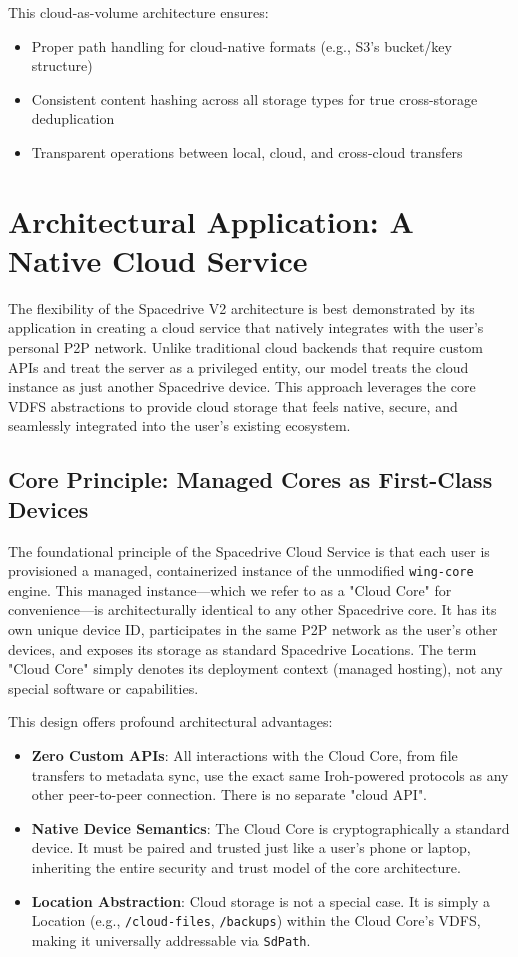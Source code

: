 \documentclass[sigconf]{acmart}
\begin{document}
This cloud-as-volume architecture ensures:
\begin{itemize}[noitemsep, topsep=0pt]
    \item Proper path handling for cloud-native formats (e.g., S3's bucket/key structure)
    \item Consistent content hashing across all storage types for true cross-storage deduplication
    \item Transparent operations between local, cloud, and cross-cloud transfers
\end{itemize}


\section{Architectural Application: A Native Cloud Service}
\label{sec:native-cloud-service}
The flexibility of the Spacedrive V2 architecture is best demonstrated by its application in creating a cloud service that natively integrates with the user's personal P2P network. Unlike traditional cloud backends that require custom APIs and treat the server as a privileged entity, our model treats the cloud instance as just another Spacedrive device. This approach leverages the core VDFS abstractions to provide cloud storage that feels native, secure, and seamlessly integrated into the user's existing ecosystem.

\subsection{Core Principle: Managed Cores as First-Class Devices}
The foundational principle of the Spacedrive Cloud Service is that each user is provisioned a managed, containerized instance of the unmodified \texttt{wing-core} engine. This managed instance—which we refer to as a "Cloud Core" for convenience—is architecturally identical to any other Spacedrive core. It has its own unique device ID, participates in the same P2P network as the user's other devices, and exposes its storage as standard Spacedrive Locations. The term "Cloud Core" simply denotes its deployment context (managed hosting), not any special software or capabilities.

This design offers profound architectural advantages:
\begin{itemize}[noitemsep, topsep=0pt]
    \item \textbf{Zero Custom APIs}: All interactions with the Cloud Core, from file transfers to metadata sync, use the exact same Iroh-powered protocols as any other peer-to-peer connection. There is no separate "cloud API".
    \item \textbf{Native Device Semantics}: The Cloud Core is cryptographically a standard device. It must be paired and trusted just like a user's phone or laptop, inheriting the entire security and trust model of the core architecture.
    \item \textbf{Location Abstraction}: Cloud storage is not a special case. It is simply a Location (e.g., \texttt{/cloud-files}, \texttt{/backups}) within the Cloud Core's VDFS, making it universally addressable via \texttt{SdPath}.
\end{itemize}
\end{document}
